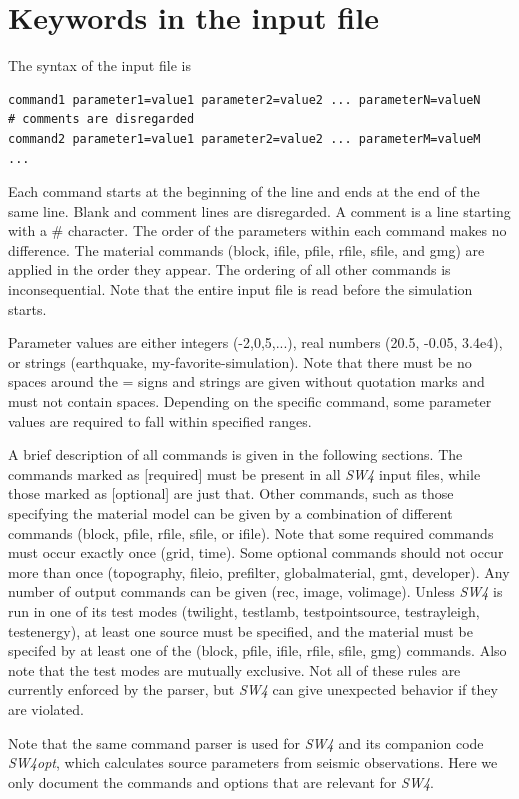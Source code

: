 \documentclass[11pt]{report}
\begin{document}
{\chapter{Keywords in the input file}\label{chap:keywords}
The syntax of the input file is
\begin{verbatim}
command1 parameter1=value1 parameter2=value2 ... parameterN=valueN
# comments are disregarded
command2 parameter1=value1 parameter2=value2 ... parameterM=valueM
...
\end{verbatim}
Each command starts at the beginning of the line and ends at the end of the same line. Blank and
comment lines are disregarded. A comment is a line starting with a \# character. The order of the
parameters within each command makes no difference. The material commands (block, ifile, pfile, rfile, sfile, and gmg)
are applied in the order they appear. The ordering of all other commands is inconsequential. Note
that the entire input file is read before the simulation starts.

Parameter values are either integers (-2,0,5,...), real numbers (20.5, -0.05, 3.4e4), or strings
(earthquake, my-favorite-simulation). Note that there must be no spaces around the = signs and
strings are given without quotation marks and must not contain spaces. Depending on the specific
command, some parameter values are required to fall within specified ranges.

A brief description of all commands is given in the following sections. The commands marked as
	[required] must be present in all \emph{SW4} input files, while those marked as [optional] are just
that. Other commands, such as those specifying the material model can be given by a combination of
different commands (block, pfile, rfile, sfile, or ifile). Note that some required commands must occur
exactly once (grid, time). Some optional commands should not occur more than once (topography,
fileio, prefilter, globalmaterial, gmt, developer). Any number of output commands can be given (rec,
image, volimage). Unless \emph{SW4} is run in one of its test modes (twilight, testlamb,
testpointsource, testrayleigh, testenergy), at least one source must be specified, and the material
must be specifed by at least one of the (block, pfile, ifile, rfile, sfile, gmg) commands. Also note that the
test modes are mutually exclusive. Not all of these rules are currently enforced by the parser, but
\emph{SW4} can give unexpected behavior if they are violated.

Note that the same command parser is used for \emph{SW4} and its companion code \emph{SW4opt}, which
calculates source parameters from seismic observations. Here we only document the commands and options
that are relevant for \emph{SW4}.

}
\end{document}
